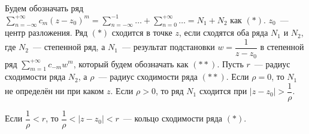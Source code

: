 
Будем обозначать ряд \(\sum\limits_{n = -\infty}^{+\infty} c_m(z-z_0)^m = \sum\limits_{n = -\infty}
^{-1}\dots + \sum\limits_{n = 0}^{+\infty}\dots = N_1 + N_2\) как \((*)\). \(z_0\)~--- центр 
разложения. Ряд \((*)\) сходится в точке \(z\), если сходятся оба ряда \(N_1\) и \(N_2\), где 
\(N_2\)~--- степенной ряд, а \(N_1\)~--- результат подстановки \(w = \dfrac{1}{z-z_0}\) в степенной 
ряд \(\sum\limits_{m = 1}^{+\infty}c_{-m}w^m\), который будем обозначать как \((**)\). Пусть 
\(r\)~--- радиус сходимости ряда \(N_2\), а \(\rho\)~--- радиус сходимости ряда \((**)\). Если 
\(\rho = 0\), то \(N_1\) не определён ни при каком \(z\). Если \(\rho > 0\), то ряд \(N_1\) сходится
при \(|z-z_0| > \dfrac{1}{\rho}\).

\begin{definition}
    Если \(\dfrac{1}{\rho} < r\), то \(\dfrac{1}{\rho} < |z - z_0| < r\)~--- кольцо сходимости ряда
    \((*)\).
\end{definition}